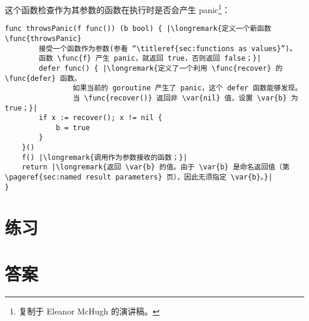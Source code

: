 这个函数检查作为其参数的函数在执行时是否会产生 panic\footnote{复制于
Eleanor McHugh 的演讲稿。}：
\begin{lstlisting}
func throwsPanic(f func()) (b bool) { |\longremark{定义一个新函数 \func{throwsPanic} 
		接受一个函数作为参数(参看 “\titleref{sec:functions as values}”)。
		函数 \func{f} 产生 panic，就返回 true，否则返回 false；}|
		defer func() { |\longremark{定义了一个利用 \func{recover} 的 \func{defer} 函数。
				如果当前的 goroutine 产生了 panic，这个 defer 函数能够发现。
				当 \func{recover()} 返回非 \var{nil} 值，设置 \var{b} 为 true；}|
        if x := recover(); x != nil {
            b = true
        }
    }()
    f() |\longremark{调用作为参数接收的函数；}|
	return |\longremark{返回 \var{b} 的值。由于 \var{b} 是命名返回值（第 \pageref{sec:named result parameters} 页），因此无须指定 \var{b}。}|
}
\end{lstlisting}
\showremarks


\section{练习}




















\cleardoublepage
\section{答案}
\shipoutAnswer
